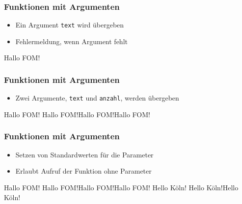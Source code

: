 \documentclass[ngerman]{beamer}
\newcommand{\ta}[1]{\textattachfile[color=1 0 0]{#1}{Code}}
\begin{document}
\begin{frame}[containsverbatim]
\frametitle{Funktionen mit Argumenten}

\begin{itemize}
	\item Ein Argument \texttt{text} wird übergeben
	\item Fehlermeldung, wenn Argument fehlt
\end{itemize}

%

\begin{ausgabe}
Hallo FOM!
\end{ausgabe}


\end{frame}

\begin{frame}[containsverbatim]
\frametitle{Funktionen mit Argumenten}

\begin{itemize}
	\item Zwei Argumente, \texttt{text} und \texttt{anzahl}, werden übergeben
\end{itemize}

%

\begin{ausgabe}

Hallo FOM!
Hallo FOM!Hallo FOM!Hallo FOM!

\end{ausgabe}

\end{frame}

\begin{frame}[containsverbatim]
\frametitle{Funktionen mit Argumenten}

\begin{itemize}
	\item Setzen von Standardwerten für die Parameter
	\item Erlaubt Aufruf der Funktion ohne Parameter
\end{itemize}

%

\begin{ausgabe}
Hallo FOM!
Hallo FOM!Hallo FOM!Hallo FOM!
Hello Köln!
Hello Köln!Hello Köln!
\end{ausgabe}

\end{frame}
\end{document}
